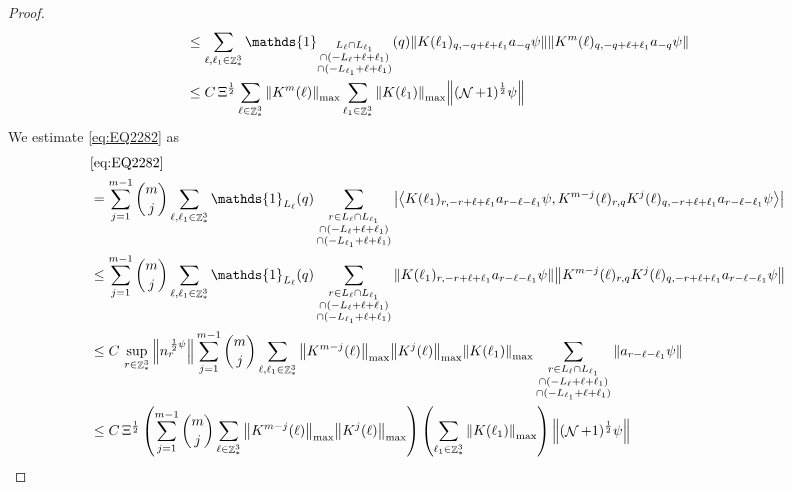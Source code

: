 \documentclass[sn-mathphys, Numbered ,a4paper]{sn-jnl}%
\DeclareMathOperator{\Z}{\mathbb{Z}}
\DeclareMathOperator{\NN}{\mathcal{N}}
\newcommand{\half}{\frac{1}{2}}
\newcommand{\eva}[1]{\left\langle #1 \right\rangle}
\theoremstyle{plain}
\theoremstyle{definition}
\theoremstyle{remark}
\theoremstyle{plain}
\theoremstyle{definition}
\theoremstyle{remark}
\begin{document}
\begin{proof}
\begin{align}
	&\leq \sum\limits_{\ell, \ell_1\in \Z^3_*} \mathds{1}_{\substack{L_{\ell}\cap L_{\ell_1}\\\cap (-L_{\ell}+\ell+\ell_1) \\ \cap (-L_{\ell_1}+\ell+\ell_1)}}(q) \norm{ K(\ell_1)_{q,-q+\ell+\ell_1} a_{-q} \psi}\norm{ K^m(\ell)_{q,-q+\ell+\ell_1} a_{-q} \psi }\nonumber\\
	&\leq C\,\Xi^\half \sum\limits_{\ell \in \Z^3_*} \norm{K^m(\ell)}_{\mathrm{max}} \sum\limits_{\ell_1 \in \Z^3_*} \norm{K(\ell_1)}_{\mathrm{max}}   \norm{  (\NN+1)^\half \psi}\label{eq:estEQ2281}
\end{align}
We estimate \eqref{eq:EQ2282} as
\begin{align}
	& \eqref{eq:EQ2282}\nonumber\\
	&= \sum\limits_{j=1}^{m-1} {{m}\choose j} \sum\limits_{\ell, \ell_1\in \Z^3_*}\mathds{1}_{L_{\ell}}(q) \sum\limits_{\substack{r\in L_{\ell} \cap L_{\ell_1}\\\cap (-L_{\ell}+\ell+\ell_1) \\ \cap (-L_{\ell_1}+\ell+\ell_1)}}  \abs{\eva{ K(\ell_1)_{r,-r+\ell+\ell_1} a_{r-\ell-\ell_1} \psi, K^{m-j}(\ell)_{r,q} K^j(\ell)_{q,-r+\ell+\ell_1} a_{r-\ell-\ell_1} \psi }}\nonumber\\
	&\leq \sum\limits_{j=1}^{m-1} {{m}\choose j} \sum\limits_{\ell, \ell_1\in \Z^3_*}\mathds{1}_{L_{\ell}}(q) \sum\limits_{\substack{r\in L_{\ell} \cap L_{\ell_1}\\\cap (-L_{\ell}+\ell+\ell_1) \\ \cap (-L_{\ell_1}+\ell+\ell_1)}}  \norm{ K(\ell_1)_{r,-r+\ell+\ell_1} a_{r-\ell-\ell_1} \psi} \norm{ K^{m-j}(\ell)_{r,q} K^j(\ell)_{q,-r+\ell+\ell_1} a_{r-\ell-\ell_1} \psi} \nonumber\\
	&\leq C\, \sup\limits_{r \in \Z^3_*}\norm{n_r^{\,\half\psi}} \sum\limits_{j=1}^{m-1} {{m}\choose j} \sum\limits_{\ell, \ell_1\in \Z^3_*} \norm{K^{m-j}(\ell)}_{\mathrm{max}} \norm{K^j(\ell)}_{\mathrm{max}} \norm{ K(\ell_1)}_{\mathrm{max}} \sum\limits_{\substack{r\in L_{\ell} \cap L_{\ell_1}\\\cap (-L_{\ell}+\ell+\ell_1) \\ \cap (-L_{\ell_1}+\ell+\ell_1)}}  \norm{ a_{r-\ell-\ell_1} \psi}\nonumber\\
	&\leq C\,\Xi^\half \left(\sum\limits_{j=1}^{m-1} {{m}\choose j} \sum\limits_{ \ell\in \Z^3_*} \norm{K^{m-j}(\ell)}_{\mathrm{max}} \norm{K^j(\ell)}_{\mathrm{max}}\right) \left(\sum\limits_{ \ell_1\in \Z^3_*}\norm{ K(\ell_1)}_{\mathrm{max}} \right) \norm{ (\NN+1)^\half \psi}\label{eq:estEQ2282}

\end{align}
\end{proof}
\end{document}
